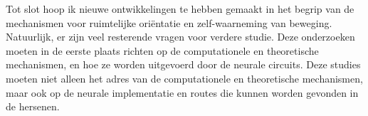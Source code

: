 Tot slot hoop ik nieuwe ontwikkelingen te hebben gemaakt in het begrip van de mechanismen voor ruimtelijke oriëntatie en zelf-waarneming van beweging. Natuurlijk, er zijn veel resterende vragen voor verdere studie. Deze onderzoeken moeten in de eerste plaats richten op de computationele en theoretische mechanismen, en hoe ze worden uitgevoerd door de neurale circuits. Deze studies moeten niet alleen het adres van de computationele en theoretische mechanismen, maar ook op de neurale implementatie en routes die kunnen worden gevonden in de hersenen.
